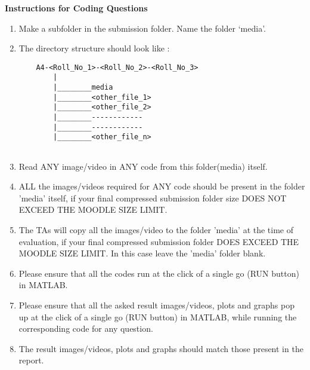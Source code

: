 \documentclass[11pt]{article}
\begin{document}
\noindent\textbf{Instructions for Coding Questions}
\begin{enumerate}
  \item Make a subfolder in the submission folder. Name the folder `media'.
  \item The directory structure should look like :
  \begin{verbatim}
    A4-<Roll_No_1>-<Roll_No_2>-<Roll_No_3>
        |	
        |________media
        |________<other_file_1>
        |________<other_file_2>
        |________------------
        |________------------
        |________<other_file_n>
        
  \end{verbatim}
  
  \item Read ANY image/video	in ANY code from this folder(media) itself.
  
  \item ALL the images/videos required for ANY code should be present in the folder 'media' itself, if your  final compressed submission folder size DOES NOT EXCEED THE MOODLE SIZE LIMIT.
  
  \item The TAs will copy all the images/video to the folder 'media' at the time of evaluation, if your final compressed submission folder DOES EXCEED THE MOODLE SIZE LIMIT. In this case leave the 'media' folder blank.
  
  \item Please ensure that all the codes run at the click of a single go (RUN button) in MATLAB.
  
  \item Please ensure that all the asked result images/videos, plots and graphs pop up at the click of a single go (RUN button) in MATLAB, while running the corresponding code for any question.
  
  \item The result images/videos, plots and graphs should match those present in the report.

\end{enumerate}
\end{document}
